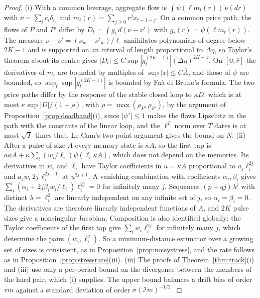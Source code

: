 \begin{proof}
(i) With a common leverage, aggregate flow is $\int\psi(\ell m_t(r))\,\nu(dr)$ with $\nu=\sum_ic_i\delta_{r_i}$ and $m_t(r)=\sum_{j\ge0}r^jx_{t-1-j}$. On a common price path, the flows of $P$ and $P'$ differ by $D_t=\int g_t\,d(\nu-\nu')$ with $g_t(r)=\psi(\ell m_t(r))$. The measure $\nu-\nu'=(\nu_w-\nu'_w)/\ell$ annihilates polynomials of degree below $2K-1$ and is supported on an interval of length proportional to $\Delta\eta$, so Taylor's theorem about its centre gives $|D_t|\le C\sup|g_t^{(2K-1)}|(\Delta\eta)^{2K-1}$. On $[0,\bar r]$ the derivatives of $m_t$ are bounded by multiples of $\sup|x|\le C\bar A$, and those of $\psi$ are bounded, so $\sup_t\sup|g_t^{(2K-1)}|$ is bounded by Fa\`a di Bruno's formula. The two price paths differ by the response of the stable closed loop to $\kappa D$, which is at most $\kappa\sup|D|/(1-\rho)$, with $\rho=\max(\rho_P,\rho_{P'})$, by the argument of Proposition~\ref{prop:deadband}(i), since $|\psi'|\le1$ makes the flows Lipschitz in the path with the constants of the linear loop, and the $\ell^2$ norm over $T$ dates is at most $\sqrt T$ times that. Le Cam's two-point argument gives the bound on $N$. (ii) After a pulse of size $A$ every memory state is $\kappa A$, so the first tap is $a\kappa A+\kappa\sum_i(w_i/\ell_i)\psi(\ell_i\kappa A)$, which does not depend on the memories. Its derivatives in $w_i$ and $\ell_i$ have Taylor coefficients in $u=\kappa A$ proportional to $a_j\ell_i^{2j}$ and $a_jw_i\,2j\,\ell_i^{2j-1}$ at $u^{2j+1}$. A vanishing combination with coefficients $\alpha_i,\beta_i$ gives $\sum_i(\alpha_i+2j\beta_iw_i/\ell_i)\ell_i^{2j}=0$ for infinitely many $j$. Sequences $(p+qj)\lambda^j$ with distinct $\lambda=\ell_i^2$ are linearly independent on any infinite set of $j$, so $\alpha_i=\beta_i=0$. The derivatives are therefore linearly independent functions of $A$, and $2K$ pulse sizes give a nonsingular Jacobian. Composition is also identified globally: the Taylor coefficients of the first tap give $\sum_iw_i\ell_i^{2j}$ for infinitely many $j$, which determine the pairs $(w_i,\ell_i^2)$. So a minimum-distance estimator over a growing set of sizes is consistent, as in Proposition~\ref{prop:noisystress}, and the rate follows as in Proposition~\ref{prop:stressrate}(iii). (iii) The proofs of Theorem~\ref{thm:track}(i) and (iii) use only a per-period bound on the divergence between the members of the hard pair, which (i) supplies. The upper bound balances a drift bias of order $vm$ against a standard deviation of order $\sigma(\mathcal Im)^{-1/2}$.
\end{proof}


